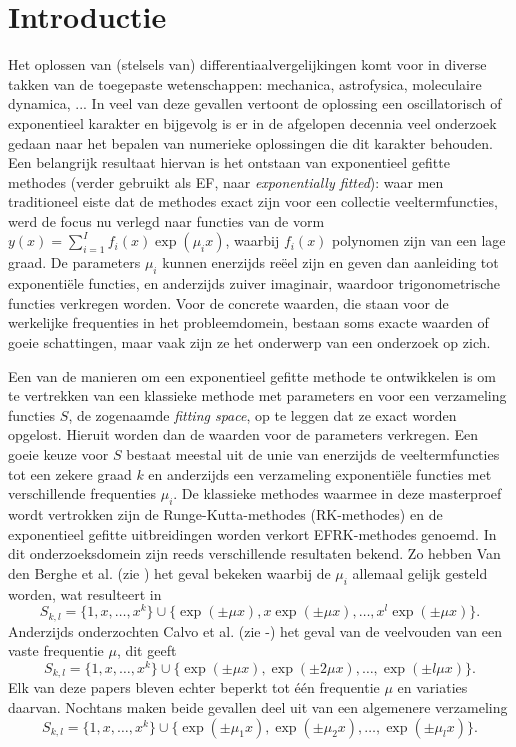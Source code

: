 \documentclass[12pt]{article}
\begin{document}
\newpage
\tableofcontents
\newpage

\section{Introductie}
Het oplossen van (stelsels van) differentiaalvergelijkingen komt voor in diverse takken van de toegepaste wetenschappen: mechanica, astrofysica, moleculaire dynamica, ... In veel van deze gevallen vertoont de oplossing een oscillatorisch of exponentieel karakter en bijgevolg is er in de afgelopen decennia veel onderzoek gedaan naar het bepalen van numerieke oplossingen die dit karakter behouden. Een belangrijk resultaat hiervan is het ontstaan van exponentieel gefitte methodes (verder gebruikt als EF, naar \textit{exponentially fitted}): waar men traditioneel eiste dat de methodes exact zijn voor een collectie veeltermfuncties, werd de focus nu verlegd naar functies van de vorm \(y(x)=\sum_{i=1}^If_i(x)\exp(\mu_ix)\), waarbij \(f_i(x)\) polynomen zijn van een lage graad. De parameters \(\mu_i\) kunnen enerzijds reëel zijn en geven dan aanleiding tot exponentiële functies, en anderzijds zuiver imaginair, waardoor trigonometrische functies verkregen worden. Voor de concrete waarden, die staan voor de werkelijke frequenties in het probleemdomein, bestaan soms exacte waarden of goeie schattingen, maar vaak zijn ze het onderwerp van een onderzoek op zich.

Een van de manieren om een exponentieel gefitte methode te ontwikkelen is om te vertrekken van een klassieke methode met parameters en voor een verzameling functies \(S\), de zogenaamde \textit{fitting space}, op te leggen dat ze exact worden opgelost. Hieruit worden dan de waarden voor de parameters verkregen. Een goeie keuze voor \(S\) bestaat meestal uit de unie van enerzijds de veeltermfuncties tot een zekere graad \(k\) en anderzijds een verzameling exponentiële functies met verschillende frequenties \(\mu_i\). De klassieke methodes waarmee in deze masterproef wordt vertrokken zijn de Runge-Kutta-methodes (RK-methodes) en de exponentieel gefitte uitbreidingen worden verkort EFRK-methodes genoemd. In dit onderzoeksdomein zijn reeds verschillende resultaten bekend. Zo hebben Van den Berghe et al. (zie \cite{EFRKrevisited}) het geval bekeken waarbij de \(\mu_i\) allemaal gelijk gesteld worden, wat resulteert in
\[S_{k,l}=\{1,x,\dots,x^k\}\cup\{\exp(\pm\mu x),x\exp(\pm\mu x),\dots,x^l\exp(\pm\mu x)\}.\]
Anderzijds onderzochten Calvo et al. (zie \cite{6thordersympl}-\cite{6thordersympl2}) het geval van de veelvouden van een vaste frequentie \(\mu\), dit geeft
\[S_{k,l}=\{1,x,\dots,x^k\}\cup\{\exp(\pm\mu x),\exp(\pm2\mu x),\dots,\exp(\pm l\mu x)\}.\]
Elk van deze papers bleven echter beperkt tot één frequentie \(\mu\) en variaties daarvan. Nochtans maken beide gevallen deel uit van een algemenere verzameling 
\[S_{k,l}=\{1,x,\dots,x^k\}\cup\{\exp(\pm\mu_1x),\exp(\pm\mu_2x),\dots,\exp(\pm\mu_lx)\}.\]
\end{document}
